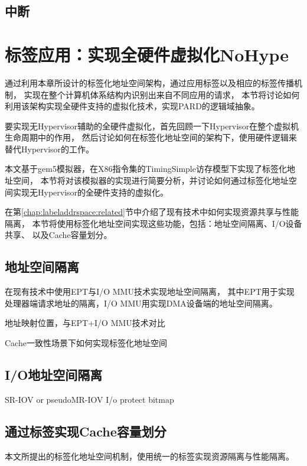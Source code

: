\subsection{中断}


\section{标签应用：实现全硬件虚拟化NoHype}

通过利用本章所设计的标签化地址空间架构，通过应用标签以及相应的标签传播机制，
实现在整个计算机体系结构内识别出来自不同应用的请求，
本节将讨论如何利用该架构实现全硬件支持的虚拟化技术，实现PARD的逻辑域抽象。

要实现无Hypervisor辅助的全硬件虚拟化，首先回顾一下Hypervisor在整个虚拟机生命周期中的作用，
然后讨论如何在标签化地址空间的架构下，使用硬件逻辑来替代Hypervisor的工作。


本文基于gem5\cite{gem5}模拟器，在X86指令集的TimingSimple访存模型下实现了标签化地址空间，
本节将对该模拟器的实现进行简要分析，并讨论如何通过标签化地址空间实现无Hypervisor的全硬件支持的虚拟化。

在第\ref{chap:labeladdrspace:related}节中介绍了现有技术中如何实现资源共享与性能隔离，
本节将使用标签化地址空间实现这些功能，包括：地址空间隔离、I/O设备共享、
以及Cache容量划分。

\subsection{地址空间隔离}

在现有技术中使用EPT与I/O MMU技术实现地址空间隔离，
其中EPT用于实现处理器端请求地址的隔离，I/O MMU用实现DMA设备端的地址空间隔离。


地址映射位置，与EPT+I/O MMU技术对比

Cache一致性场景下如何实现标签化地址空间


\subsection{I/O地址空间隔离}

SR-IOV or pseudoMR-IOV
I/o protect bitmap

\subsection{通过标签实现Cache容量划分} %

本文所提出的标签化地址空间机制，使用统一的标签实现资源隔离与性能隔离。


